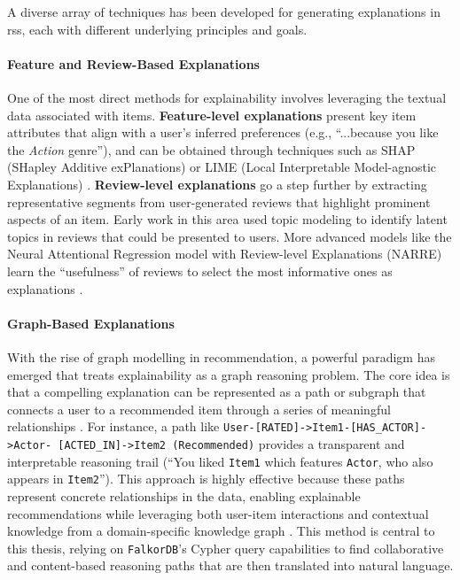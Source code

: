 A diverse array of techniques has been developed for generating explanations in \aclp{rs}, each with different underlying principles and goals.

\paragraph{Feature and Review-Based Explanations}
One of the most direct methods for explainability involves leveraging the textual data associated with items. \textbf{Feature-level explanations} present key item attributes that align with a user's inferred preferences (e.g., ``...because you like the \textit{Action} genre''), and can be obtained through techniques such as SHAP (SHapley Additive exPlanations) or LIME (Local Interpretable Model-agnostic Explanations) \cite{SHAP, LIME}. \textbf{Review-level explanations} go a step further by extracting representative segments from user-generated reviews that highlight prominent aspects of an item. Early work in this area used topic modeling to identify latent topics in reviews that could be presented to users. More advanced models like the Neural Attentional Regression model with Review-level Explanations (NARRE) learn the ``usefulness'' of reviews to select the most informative ones as explanations \cite[Section 4.1]{CHAPTER:RS-HANDBOOK-NLP}.

\paragraph{Graph-Based Explanations}
With the rise of graph modelling in recommendation, a powerful paradigm has emerged that treats explainability as a graph reasoning problem. The core idea is that a compelling explanation can be represented as a path or subgraph that connects a user to a recommended item through a series of meaningful relationships \cite{SOTA-MODEL-AGNOSTIC-GRAPH-EXPLANATIONS}. For instance, a path like \texttt{User-[RATED]->Item1-[HAS\_ACTOR]->Actor- [ACTED\_IN]->Item2 (Recommended)} provides a transparent and interpretable reasoning trail (``You liked \texttt{Item1} which features \texttt{Actor}, who also appears in \texttt{Item2}''). This approach is highly effective because these paths represent concrete relationships in the data, enabling explainable recommendations while leveraging both user-item interactions and contextual knowledge from a domain-specific knowledge graph \cite{SOTA-CONTEXT-AWARE-EXP-KG}. This method is central to this thesis, relying on \texttt{FalkorDB}'s Cypher query capabilities to find collaborative and content-based reasoning paths that are then translated into natural language.

